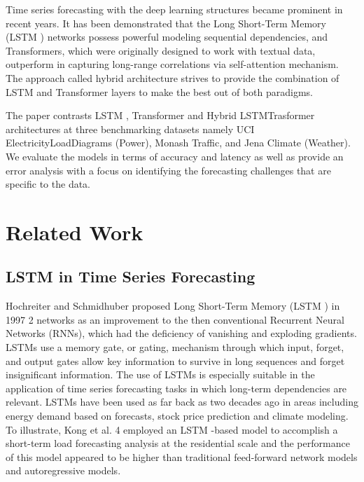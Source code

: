 \documentclass[conference]{IEEEtran}
\begin{document}
Time series forecasting with the deep learning structures became prominent in recent years. It has been demonstrated that the Long Short-Term Memory (LSTM \cite{hochreiter1997lstm}) networks possess powerful modeling sequential dependencies, and Transformers, which were originally designed to work with textual data, outperform in capturing long-range correlations via self-attention mechanism. The approach called hybrid architecture strives to provide the combination of LSTM \cite{hochreiter1997lstm} and Transformer \cite{vaswani2017attention} layers to make the best out of both paradigms.

The paper contrasts LSTM \cite{hochreiter1997lstm}, Transformer \cite{vaswani2017attention} and Hybrid \cite{wu2020deep} LSTMTrasformer architectures at three benchmarking datasets namely UCI \cite{uci2011power} ElectricityLoadDiagrams (Power), Monash \cite{godahewa2021monash} Traffic, and Jena Climate \cite{jena} (Weather). We evaluate the models in terms of accuracy and latency as well as provide an error analysis with a focus on identifying the forecasting challenges that are specific to the data.

\section{Related Work}
\subsection{LSTM in Time Series Forecasting}
Hochreiter and Schmidhuber proposed Long Short-Term Memory (LSTM \cite{hochreiter1997lstm}) in 1997 2 networks as an improvement to the then conventional Recurrent Neural Networks (RNNs), which had the deficiency of vanishing and exploding gradients. LSTMs use a memory gate, or gating, mechanism through which input, forget, and output gates allow key information to survive in long sequences and forget insignificant information. The use of LSTMs is especially suitable in the application of time series forecasting tasks in which long-term dependencies are relevant. LSTMs have been used as far back as two decades ago in areas including energy demand based on forecasts, stock price prediction and climate modeling. To illustrate, Kong et al. 4 employed an LSTM \cite{hochreiter1997lstm}-based model to accomplish a short-term load forecasting analysis at the residential scale and the performance of this model appeared to be higher than traditional feed-forward network models and autoregressive models.
\end{document}
